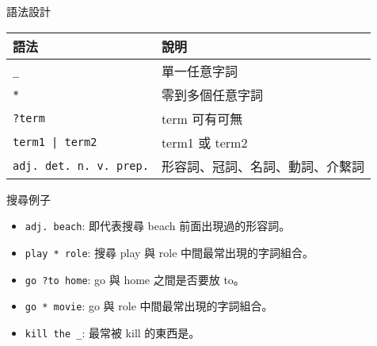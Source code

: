 \documentclass[12pt,c]{beamer}
\begin{document}
\begin{frame}[plain,shrink=5]{語法設計}
  \begin{tabu}{X[1.2]X[2]}
    \hline
    \rowfont{\bf} 語法 & 說明  \\
    \hline
    \lstinline/_/ & 單一任意字詞 \\
    \lstinline/*/ & 零到多個任意字詞  \\
    \lstinline/?term/ & term 可有可無 \\
    \lstinline!term1 | term2! & term1 或 term2 \\
    \lstinline/adj. det. n. v. prep./ & 形容詞、冠詞、名詞、動詞、介繫詞 \\
    \hline
  \end{tabu}

  \begin{block}{搜尋例子}
    \begin{itemize}
    \item \lstinline/adj. beach/: 即代表搜尋 beach 前面出現過的形容詞。
    \item \lstinline/play * role/: 搜尋 play 與 role 中間最常出現的字詞組合。
    \item \lstinline/go ?to home/: go 與 home 之間是否要放 to。
    \item \lstinline/go * movie/: go 與 role 中間最常出現的字詞組合。 
    \item \lstinline/kill the _/: 最常被 kill 的東西是。
    \end{itemize}
  \end{block}
\end{frame}
\end{document}
